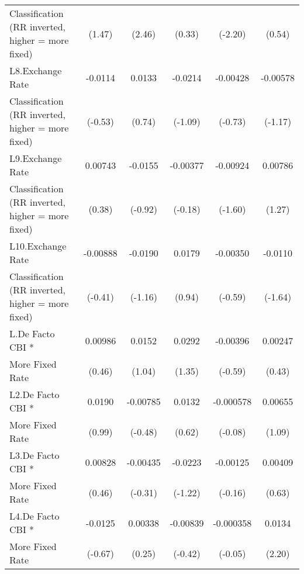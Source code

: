 {\begin{tabular}{l*{5}{c}}
Classification (RR inverted, higher = more fixed)&      (1.47)         &      (2.46)         &      (0.33)         &     (-2.20)         &      (0.54)         \\
[1em]
L8.Exchange Rate    &     -0.0114         &      0.0133         &     -0.0214         &    -0.00428         &    -0.00578         \\
Classification (RR inverted, higher = more fixed)&     (-0.53)         &      (0.74)         &     (-1.09)         &     (-0.73)         &     (-1.17)         \\
[1em]
L9.Exchange Rate    &     0.00743         &     -0.0155         &    -0.00377         &    -0.00924         &     0.00786         \\
Classification (RR inverted, higher = more fixed)&      (0.38)         &     (-0.92)         &     (-0.18)         &     (-1.60)         &      (1.27)         \\
[1em]
L10.Exchange Rate   &    -0.00888         &     -0.0190         &      0.0179         &    -0.00350         &     -0.0110         \\
Classification (RR inverted, higher = more fixed)&     (-0.41)         &     (-1.16)         &      (0.94)         &     (-0.59)         &     (-1.64)         \\
[1em]
L.De Facto CBI *    &     0.00986         &      0.0152         &      0.0292         &    -0.00396         &     0.00247         \\
More Fixed Rate     &      (0.46)         &      (1.04)         &      (1.35)         &     (-0.59)         &      (0.43)         \\
[1em]
L2.De Facto CBI *   &      0.0190         &    -0.00785         &      0.0132         &   -0.000578         &     0.00655         \\
More Fixed Rate     &      (0.99)         &     (-0.48)         &      (0.62)         &     (-0.08)         &      (1.09)         \\
[1em]
L3.De Facto CBI *   &     0.00828         &    -0.00435         &     -0.0223         &    -0.00125         &     0.00409         \\
More Fixed Rate     &      (0.46)         &     (-0.31)         &     (-1.22)         &     (-0.16)         &      (0.63)         \\
[1em]
L4.De Facto CBI *   &     -0.0125         &     0.00338         &    -0.00839         &   -0.000358         &      0.0134\sym{*}  \\
More Fixed Rate     &     (-0.67)         &      (0.25)         &     (-0.42)         &     (-0.05)         &      (2.20)         \\

\end{tabular}}
